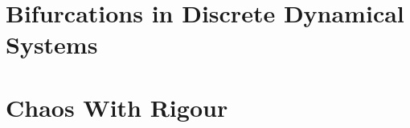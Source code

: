\documentclass[12pt,oneside]{report}
\begin{document}
\maketitle

\declaration
\dedication{Musa mihi causas memora ...\\
	Muse, tell me the cause...
}

\tableofcontents

\chapter{Bifurcations in Discrete Dynamical Systems}


\chapter{Chaos With Rigour}


%  
\printbibliography
{}
\end{document}
